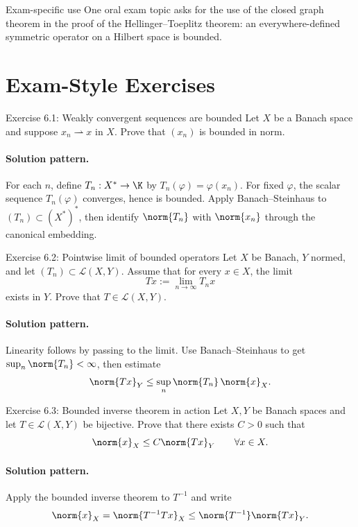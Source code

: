 \documentclass[header={Lecture 6 Exam Study Notes}]{study-note}
\begin{document}
\begin{warningbox}{Exam-specific use}
One oral exam topic asks for the use of the closed graph theorem in the proof of the Hellinger--Toeplitz theorem: an everywhere-defined symmetric operator on a Hilbert space is bounded.
\end{warningbox}

\section{Exam-Style Exercises}

\begin{exbox}{Exercise 6.1: Weakly convergent sequences are bounded}
Let $X$ be a Banach space and suppose $x_n\rightharpoonup x$ in $X$. Prove that $(x_n)$ is bounded in norm.

\paragraph{Solution pattern.}
For each $n$, define $T_n:X^*\to\K$ by $T_n(\varphi)=\varphi(x_n)$. For fixed $\varphi$, the scalar sequence $T_n(\varphi)$ converges, hence is bounded. Apply Banach--Steinhaus to $(T_n)\subset (X^*)^*$, then identify $\norm{T_n}$ with $\norm{x_n}$ through the canonical embedding.
\end{exbox}

\begin{exbox}{Exercise 6.2: Pointwise limit of bounded operators}
Let $X$ be Banach, $Y$ normed, and let $(T_n)\subset\mathcal L(X,Y)$. Assume that for every $x\in X$, the limit
\[
Tx:=\lim_{n\to\infty}T_nx
\]
exists in $Y$. Prove that $T\in\mathcal L(X,Y)$.

\paragraph{Solution pattern.}
Linearity follows by passing to the limit. Use Banach--Steinhaus to get $\sup_n\norm{T_n}<\infty$, then estimate
\[
\norm{Tx}_Y\le \sup_n\norm{T_n}\,\norm{x}_X.
\]
\end{exbox}

\begin{exbox}{Exercise 6.3: Bounded inverse theorem in action}
Let $X,Y$ be Banach spaces and let $T\in\mathcal L(X,Y)$ be bijective. Prove that there exists $C>0$ such that
\[
\norm{x}_X\le C\norm{Tx}_Y
\qquad \forall x\in X.
\]

\paragraph{Solution pattern.}
Apply the bounded inverse theorem to $T^{-1}$ and write
\[
\norm{x}_X=\norm{T^{-1}Tx}_X\le \norm{T^{-1}}\norm{Tx}_Y.
\]
\end{exbox}
\end{document}

